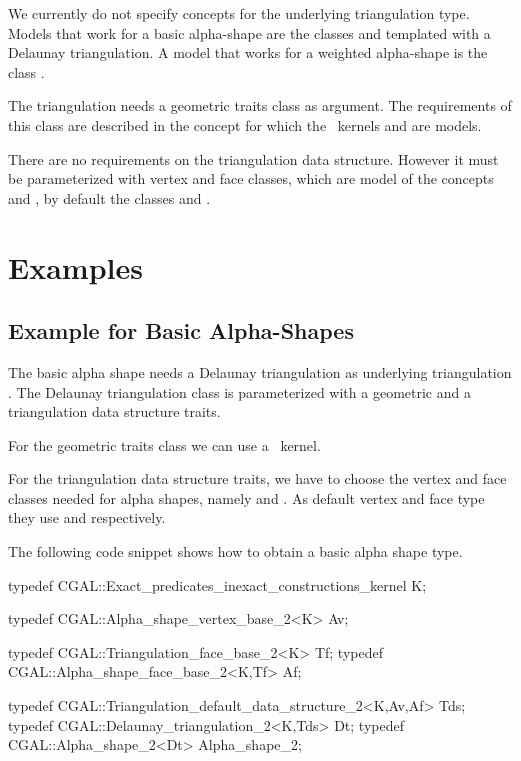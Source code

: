 We currently do not specify concepts for the underlying triangulation
type. Models that work for a basic alpha-shape are the classes
 and 
 templated with a Delaunay
triangulation. A model that works for a weighted alpha-shape is 
the class .

The triangulation needs a geometric traits class as argument.
The requirements of this class are described in the 
concept  for which
the \cgal\ kernels
and  are models.

There are no requirements on the triangulation data structure.
However it must be parameterized with 
vertex and face classes, which are model of the concepts
 and ,
by default the classes  
and .





\section{Examples}
\subsection{Example for Basic Alpha-Shapes\label{I1_SectClassicAS2D}}

The basic alpha shape needs a Delaunay triangulation as
underlying triangulation .  The Delaunay triangulation class is
parameterized with a geometric and a triangulation data structure traits.

For the geometric traits class we can use a \cgal\ kernel.

For the triangulation data structure traits, we have to
choose the vertex and face classes needed for alpha shapes,
namely  and .
As default vertex and face type they use 
and   respectively. 



The following code snippet shows how to obtain a basic
alpha shape type.

\begin{cprog}
typedef CGAL::Exact_predicates_inexact_constructions_kernel K;

typedef CGAL::Alpha_shape_vertex_base_2<K> Av;

typedef CGAL::Triangulation_face_base_2<K> Tf;
typedef CGAL::Alpha_shape_face_base_2<K,Tf> Af;

typedef CGAL::Triangulation_default_data_structure_2<K,Av,Af> Tds;
typedef CGAL::Delaunay_triangulation_2<K,Tds> Dt;
typedef CGAL::Alpha_shape_2<Dt> Alpha_shape_2;
\end{cprog}


